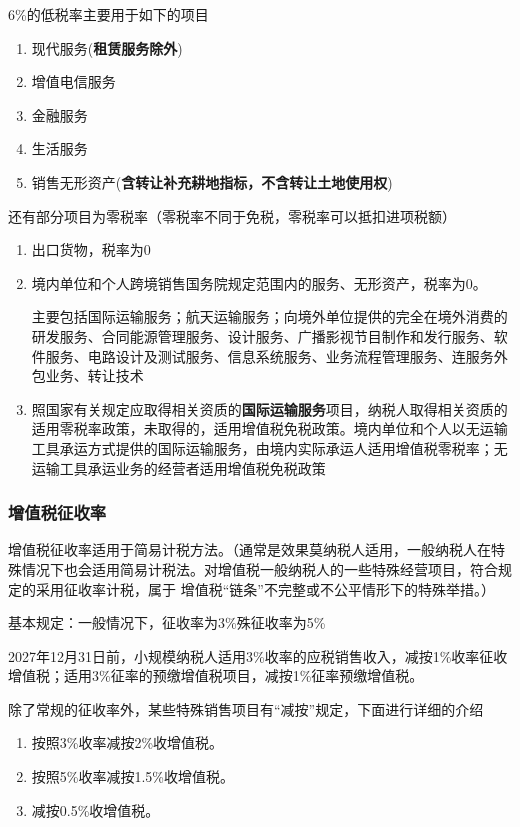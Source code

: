 \documentclass[UTF8,12pt]{ctexart}
\numberwithin{equation}{section} %
\numberwithin{figure}{section}
\numberwithin{table}{section}
\begin{document}
	6\%的低税率主要用于如下的项目
	\begin{enumerate}
		\item 现代服务(\textbf{租赁服务除外})
		
		\item 增值电信服务
		
		\item 金融服务
		
		\item 生活服务
		
		\item 销售无形资产(\textbf{含转让补充耕地指标，不含转让土地使用权})
	\end{enumerate}
	
	还有部分项目为零税率（零税率不同于免税，零税率可以抵扣进项税额）
	\begin{enumerate}
		\item 出口货物，税率为0
		
		\item 境内单位和个人跨境销售国务院规定范围内的服务、无形资产，税率为0。
		
		主要包括国际运输服务；航天运输服务；向境外单位提供的完全在境外消费的研发服务、合同能源管理服务、设计服务、广播影视节目制作和发行服务、软件服务、电路设计及测试服务、信息系统服务、业务流程管理服务、连服务外包业务、转让技术
		
		\item 照国家有关规定应取得相关资质的\textbf{国际运输服务}项目，纳税人取得相关资质的适用零税率政策，未取得的，适用增值税免税政策。境内单位和个人以无运输工具承运方式提供的国际运输服务，由境内实际承运人适用增值税零税率；无运输工具承运业务的经营者适用增值税免税政策
	\end{enumerate}

	\subsubsection{增值税征收率}
	增值税征收率适用于简易计税方法。（通常是效果莫纳税人适用，一般纳税人在特殊情况下也会适用简易计税法。对增值税一般纳税人的一些特殊经营项目，符合规定的采用征收率计税，属于
	增值税“链条”不完整或不公平情形下的特殊举措。）
	
	基本规定：一般情况下，征收率为3\%殊征收率为5\%
	
	2027年12月31日前，小规模纳税人适用3\%收率的应税销售收入，减按1\%收率征收增值税；适用3\%征率的预缴增值税项目，减按1\%征率预缴增值税。
	
	除了常规的征收率外，某些特殊销售项目有“减按”规定，下面进行详细的介绍
	\begin{enumerate}
		\item 按照3\%收率减按2\%收增值税。
		
		\item 按照5\%收率减按1.5\%收增值税。
		
		\item 减按0.5\%收增值税。
	\end{enumerate}
	
\end{document}
